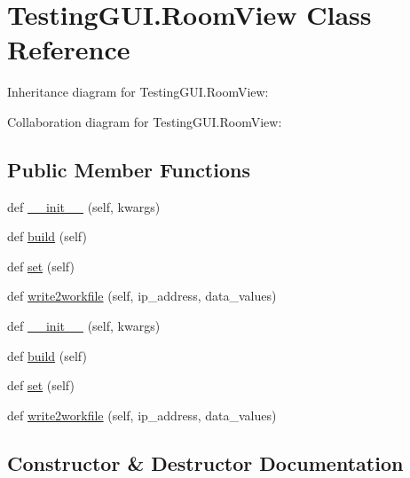 \hypertarget{classTestingGUI_1_1RoomView}{}\section{Testing\+G\+U\+I.\+Room\+View Class Reference}
\label{classTestingGUI_1_1RoomView}


Inheritance diagram for Testing\+G\+U\+I.\+Room\+View\+:


Collaboration diagram for Testing\+G\+U\+I.\+Room\+View\+:
\subsection*{Public Member Functions}
\begin{DoxyCompactItemize}
\item 
def \hyperlink{classTestingGUI_1_1RoomView_a4b1054e4342d94f4a73fecf2e3221b99}{\+\_\+\+\_\+init\+\_\+\+\_\+} (self, kwargs)
\item 
def \hyperlink{classTestingGUI_1_1RoomView_aaf1a3057048d6a1e9533750454ad5abd}{build} (self)
\item 
def \hyperlink{classTestingGUI_1_1RoomView_ab3b8e27d2d4c7ff91fdcaff4a8f53431}{set} (self)
\item 
def \hyperlink{classTestingGUI_1_1RoomView_a2c0434bb69cf431a9631990c9d445411}{write2workfile} (self, ip\+\_\+address, data\+\_\+values)
\item 
def \hyperlink{classTestingGUI_1_1RoomView_a4b1054e4342d94f4a73fecf2e3221b99}{\+\_\+\+\_\+init\+\_\+\+\_\+} (self, kwargs)
\item 
def \hyperlink{classTestingGUI_1_1RoomView_aaf1a3057048d6a1e9533750454ad5abd}{build} (self)
\item 
def \hyperlink{classTestingGUI_1_1RoomView_ab3b8e27d2d4c7ff91fdcaff4a8f53431}{set} (self)
\item 
def \hyperlink{classTestingGUI_1_1RoomView_a2c0434bb69cf431a9631990c9d445411}{write2workfile} (self, ip\+\_\+address, data\+\_\+values)
\end{DoxyCompactItemize}


\subsection{Constructor \& Destructor Documentation}
\mbox{\label{classTestingGUI_1_1RoomView_a4b1054e4342d94f4a73fecf2e3221b99}} 
